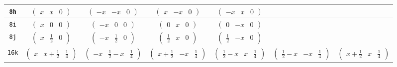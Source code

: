\documentclass[fleqn,9pt,landscape]{jsarticle}
\begin{document}
\begin{center}
\begin{longtable}{ccccccc}
{\tt 8h} & $ \begin{pmatrix} x & x & 0 \end{pmatrix} $ & $ \begin{pmatrix} - x & - x & 0 \end{pmatrix} $ & $ \begin{pmatrix} x & - x & 0 \end{pmatrix} $ & $ \begin{pmatrix} - x & x & 0 \end{pmatrix} $ & $  $ & $  $ \\ \hline
{\tt 8i} & $ \begin{pmatrix} x & 0 & 0 \end{pmatrix} $ & $ \begin{pmatrix} - x & 0 & 0 \end{pmatrix} $ & $ \begin{pmatrix} 0 & x & 0 \end{pmatrix} $ & $ \begin{pmatrix} 0 & - x & 0 \end{pmatrix} $ & $  $ & $  $ \\ \hline
{\tt 8j} & $ \begin{pmatrix} x & \frac{1}{2} & 0 \end{pmatrix} $ & $ \begin{pmatrix} - x & \frac{1}{2} & 0 \end{pmatrix} $ & $ \begin{pmatrix} \frac{1}{2} & x & 0 \end{pmatrix} $ & $ \begin{pmatrix} \frac{1}{2} & - x & 0 \end{pmatrix} $ & $  $ & $  $ \\ \hline
{\tt 16k} & $ \begin{pmatrix} x & x + \frac{1}{2} & \frac{1}{4} \end{pmatrix} $ & $ \begin{pmatrix} - x & \frac{1}{2} - x & \frac{1}{4} \end{pmatrix} $ & $ \begin{pmatrix} x + \frac{1}{2} & - x & \frac{1}{4} \end{pmatrix} $ & $ \begin{pmatrix} \frac{1}{2} - x & x & \frac{1}{4} \end{pmatrix} $ & $ \begin{pmatrix} \frac{1}{2} - x & - x & \frac{1}{4} \end{pmatrix} $ & $ \begin{pmatrix} x + \frac{1}{2} & x & \frac{1}{4} \end{pmatrix} $ \\

\end{longtable}
\end{center}
\end{document}
